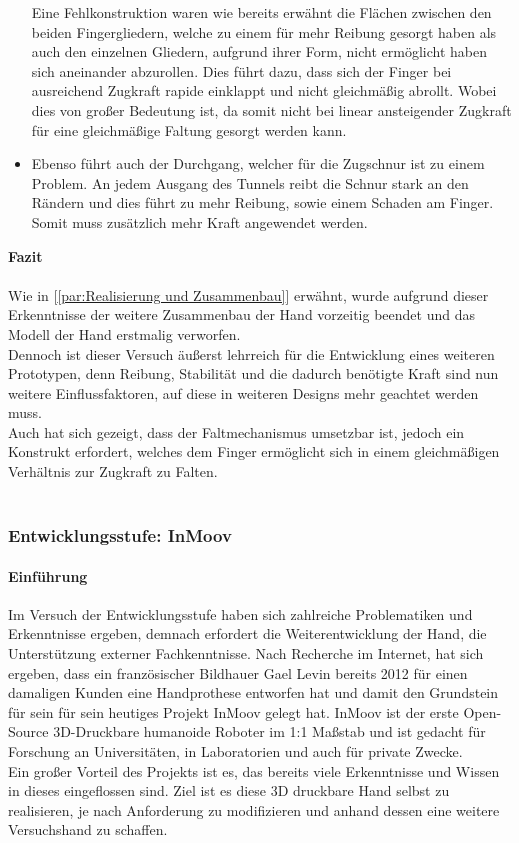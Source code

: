 \documentclass[titlepage,12pt,twoside]{article}
\begin{document}
\begin{itemize}
	Eine Fehlkonstruktion waren wie bereits erwähnt die Flächen zwischen den 
	beiden Fingergliedern, welche zu einem für mehr Reibung gesorgt haben als auch den einzelnen 
	Gliedern, aufgrund ihrer Form, nicht ermöglicht haben 
	sich aneinander abzurollen. Dies führt dazu, dass sich der Finger bei ausreichend 
	Zugkraft rapide einklappt und nicht gleichmäßig abrollt.  Wobei dies von großer 
	Bedeutung ist, da somit nicht bei linear ansteigender Zugkraft für eine 
	gleichmäßige Faltung gesorgt werden kann.
	\item Ebenso führt auch der Durchgang, welcher für die Zugschnur ist zu 
	einem Problem. An jedem Ausgang des Tunnels reibt die Schnur stark an den 
	Rändern und dies führt zu mehr Reibung, sowie einem Schaden am Finger.
	Somit muss zusätzlich mehr Kraft angewendet werden.
\end{itemize}
\hfill \break
\textbf{Fazit} \\
\\
Wie in [\textcolor{blue}{\autoref{par:Realisierung und Zusammenbau}}] erwähnt, wurde aufgrund 
dieser Erkenntnisse der weitere Zusammenbau der Hand vorzeitig beendet und das 
Modell der Hand erstmalig verworfen. \\
Dennoch ist dieser Versuch äußerst lehrreich für die Entwicklung eines weiteren 
Prototypen, denn Reibung, Stabilität und die dadurch benötigte Kraft sind nun 
weitere Einflussfaktoren, auf diese in weiteren Designs mehr geachtet werden 
muss. \\
Auch hat sich gezeigt, dass der Faltmechanismus umsetzbar ist, jedoch ein Konstrukt 
erfordert, welches dem Finger ermöglicht sich in einem gleichmäßigen Verhältnis 
zur Zugkraft zu Falten. \\
\\

\subsubsection{Entwicklungsstufe: InMoov}
\label{chap:Entwicklungsstufe: InMoov}
\paragraph{Einführung}
\hfill \break
\hfill \break
Im Versuch der Entwicklungsstufe  haben sich zahlreiche Problematiken und 
Erkenntnisse ergeben, demnach erfordert die Weiterentwicklung der Hand, 
die Unterstützung externer Fachkenntnisse.
Nach Recherche im Internet, hat sich ergeben, dass ein französischer 
Bildhauer Gael Levin bereits 2012 für einen damaligen Kunden eine Handprothese 
entworfen hat und damit den Grundstein für sein für sein heutiges Projekt 
InMoov gelegt hat. InMoov ist der erste Open-Source 3D-Druckbare humanoide 
Roboter im 1:1 Maßstab und ist gedacht für Forschung an Universitäten, in 
Laboratorien und auch für private Zwecke. \\
Ein großer Vorteil des Projekts ist es, das bereits viele Erkenntnisse und 
Wissen in dieses eingeflossen sind. Ziel ist es diese 3D druckbare Hand 
selbst zu realisieren, je nach Anforderung zu modifizieren und anhand dessen 
eine weitere Versuchshand zu schaffen. \\
\\
\end{document}
